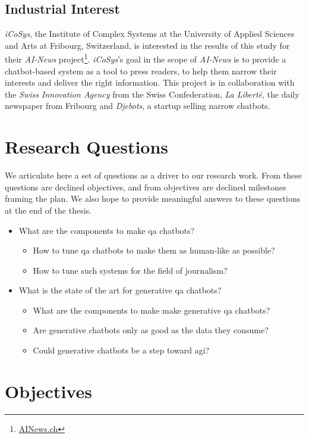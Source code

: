 \subsection*{Industrial Interest}
\textit{iCoSys}, the Institute of Complex Systems at the University of Applied Sciences and Arts at Fribourg, Switzerland, is interested in the results of this study for their \textit{AI-News} project\footnote{\url{AINews.ch}}. \textit{iCoSys}'s goal in the scope of \textit{AI-News} is to provide a chatbot-based system as a tool to press readers, to help them narrow their interests and deliver the right information. This project is in collaboration with the \textit{Swiss Innovation Agency} from the Swiss Confederation, \textit{La Liberté}, the daily newspaper from Fribourg and \textit{Djebots}, a startup selling narrow chatbots.

\section*{Research Questions}
We articulate here a set of questions as a driver to our research work. From these questions are declined objectives, and from objectives are declined milestones framing the plan. We also hope to provide meaningful answers to these questions at the end of the thesis.
\begin{itemize}[noitemsep]
    \item What are the components to make \gls{qa} chatbots?
    \begin{itemize}[noitemsep]
        \item How to tune \gls{qa} chatbots to make them as human-like as possible?
        \item How to tune such systems for the field of journalism?
    \end{itemize}
    \item What is the state of the art for generative \gls{qa} chatbots?
    \begin{itemize}[noitemsep]
    	\item What are the components to make make generative \gls{qa} chatbots?
        \item Are generative chatbots only as good as the data they consume?
        \item Could generative chatbots be a step toward \gls{agi}?
    \end{itemize}
\end{itemize}

\section*{Objectives}
